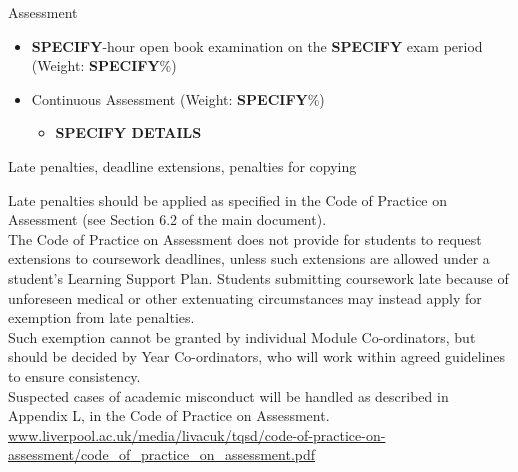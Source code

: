 
\begin{frame}{Assessment}

\begin{itemize}

    \item 
    {\bf \color{red}SPECIFY}-hour open book examination on the {\bf \color{red}SPECIFY} exam period
    (Weight: {\bf \color{red}SPECIFY}\%)
    \vspace{0.2cm}

    \item
    Continuous Assessment
    (Weight: {\bf \color{red}SPECIFY}\%)

      \begin{itemize}
        \item  {\bf \color{red}SPECIFY DETAILS}
      \end{itemize}

\end{itemize}

\begin{block001}{Late penalties, deadline extensions, penalties for copying}
\begin{center}
{\tiny
  Late penalties should be applied as specified in the Code of Practice on Assessment (see Section 6.2 of the main document).\\
  The Code of Practice on Assessment does not provide for students to request extensions to coursework deadlines, 
  unless such extensions are allowed under a student’s Learning Support Plan.  
  Students submitting coursework late because of unforeseen medical or other extenuating circumstances may instead 
  apply for exemption from late penalties.\\
  Such exemption cannot be granted by individual Module Co-ordinators, but should be decided by Year Co-ordinators, 
  who will work within agreed guidelines to ensure consistency. \\
  Suspected cases of academic misconduct will be handled as described in Appendix L, in the Code of Practice on Assessment.\\
  \href{www.liverpool.ac.uk/media/livacuk/tqsd/code-of-practice-on-assessment/code\_of\_practice\_on\_assessment.pdf}
       {www.liverpool.ac.uk/media/livacuk/tqsd/code-of-practice-on-assessment/code\_of\_practice\_on\_assessment.pdf}\\
}
\end{center}   
\end{block001}
        
\end{frame}
